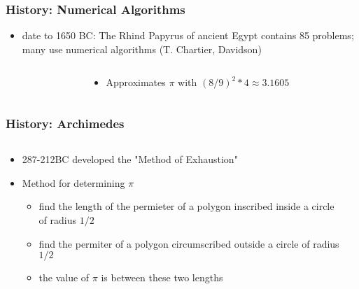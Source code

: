\documentclass[10pt]{beamer}
\begin{document}
\begin{frame}
\frametitle{History: Numerical Algorithms}
\begin{itemize}
\item date to 1650 BC: The Rhind Papyrus of ancient Egypt contains 85
problems; many use numerical algorithms (T. Chartier, Davidson)
\end{itemize}
\begin{columns}
  \begin{column}{0.55\textwidth}
  \end{column}
  \begin{column}{0.35\textwidth}
    \begin{itemize}
        \item Approximates $\pi$ with $(8/9)^2 * 4 \approx 3.1605$
    \end{itemize}
  \end{column}
\end{columns}
\end{frame}
\begin{frame}
\frametitle{History: Archimedes}
\begin{columns}
  \begin{column}{0.55\textwidth}
    \begin{itemize}
    \item 287-212BC developed the "Method of Exhaustion"
    \item Method for determining $\pi$
      \begin{itemize}
        \item find the length of the permieter of a polygon inscribed inside a
        circle of radius $1/2$
        \item find the permiter of a polygon circumscribed outside a circle
        of radius $1/2$
        \item the value of $\pi$ is between these two lengths
      \end{itemize}
    \end{itemize}
  \end{column}
  \begin{column}{0.35\textwidth}
  \end{column}
\end{columns}
\end{frame}
\end{document}
